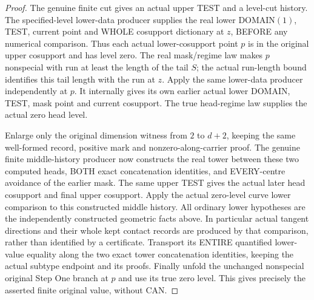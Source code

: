 \begin{proof}
The genuine finite cut gives an actual upper TEST and a level-cut history.
The specified-level lower-data producer supplies the real lower DOMAIN$(1)$,
TEST, current point and WHOLE cosupport dictionary at $z$, BEFORE any
numerical comparison. Thus each actual lower-cosupport point $p$ is in the
original upper cosupport and has level zero. The real mask/regime law makes
$p$ nonspecial with run at least the length of the tail $S$; the actual
run-length bound identifies this tail length with the run at $z$.
Apply the same lower-data producer independently at $p$. It internally
gives its own earlier actual lower DOMAIN, TEST, mask point and current
cosupport. The true head-regime law supplies the actual zero head level.

Enlarge only the original dimension witness from $2$ to $d+2$, keeping the
same well-formed record, positive mark and nonzero-along-carrier proof.
The genuine finite middle-history producer now constructs the real tower
between these two computed heads, BOTH exact concatenation identities,
and EVERY-centre avoidance of the earlier mask. The same upper TEST gives
the actual later head cosupport and final upper cosupport. Apply the actual
zero-level curve lower comparison to this constructed middle history.
All ordinary lower hypotheses are the independently constructed geometric
facts above. In particular actual tangent directions and their whole kept
contact records are produced by that comparison, rather than identified
by a certificate. Transport its ENTIRE quantified lower-value equality
along the two exact tower concatenation identities, keeping the actual
subtype endpoint and its proofs. Finally unfold the unchanged nonspecial
original Step One branch at $p$ and use its true zero level. This gives
precisely the asserted finite original value, without CAN.
\end{proof}

